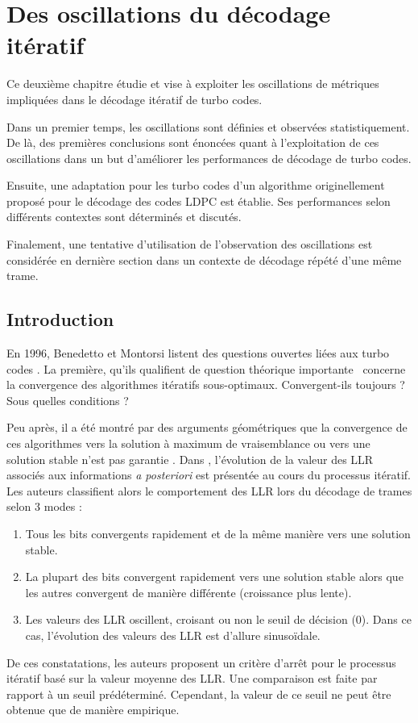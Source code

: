 \chapter{Des oscillations du décodage itératif} %
Ce deuxième chapitre étudie et vise à exploiter les oscillations de métriques impliquées dans le décodage itératif de turbo codes. 

Dans un premier temps, les oscillations sont définies et observées statistiquement. De là, des premières conclusions sont
énoncées quant à l'exploitation de ces oscillations dans un but d'améliorer les performances de décodage de turbo codes.

Ensuite, une adaptation pour les turbo codes d'un algorithme originellement proposé pour le décodage des codes LDPC est 
établie. Ses performances selon différents contextes sont déterminés et discutés.

Finalement, une tentative d'utilisation de l'observation des oscillations est considérée en dernière section dans un 
contexte de décodage répété d'une même trame.

\vspace*{\fill}
\minitocTITI
\vspace*{\fill}
\newpage

\section{Introduction}\label{sec:ch2_intro} 
En 1996, Benedetto et Montorsi listent des questions ouvertes liées aux turbo codes \cite{benedetto_unveiling}. La
première, qu'ils qualifient de \og question théorique importante \fg ~concerne la convergence des algorithmes itératifs 
sous-optimaux. \og Convergent-ils toujours ? Sous quelles conditions ? \fg

Peu après, il a été montré par des arguments géométriques que la convergence de ces algorithmes vers la solution à 
maximum de vraisemblance ou vers une solution stable n'est pas garantie \cite{richardson_geometry}.
Dans \cite{reid_convergence}, l'évolution de la valeur des LLR associés aux informations \textit{a posteriori} est présentée au 
cours du processus itératif. Les auteurs classifient alors le comportement des LLR lors du décodage de trames selon 3 modes : 
\begin{enumerate}
	\item Tous les bits convergents rapidement et de la même manière vers une solution stable.
	\item La plupart des bits convergent rapidement vers une solution stable alors que les autres convergent de manière 
	différente (croissance plus lente).
	\item Les valeurs des LLR oscillent, croisant ou non le seuil de décision (0). Dans ce cas, l'évolution
	des valeurs des LLR est d'allure sinusoïdale.
\end{enumerate}
De ces constatations, les auteurs proposent un critère d'arrêt pour le processus itératif basé sur la valeur moyenne des 
LLR. Une comparaison est faite par rapport à un seuil prédéterminé. Cependant, la valeur de ce seuil ne peut être 
obtenue que de manière empirique. %

